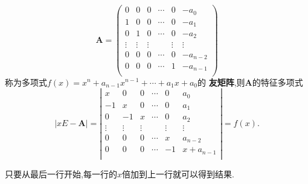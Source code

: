 \documentclass[lang=cn,newtx,10pt,scheme=chinese]{elegantbook}
\begin{document}
\begin{proposition}\label{pro:友矩阵的特征多项式/行列式}
\begin{equation}
\boldsymbol{A}=\left( \begin{matrix}
0&		0&		0&		\cdots&		0&		-a_0\\
1&		0&		0&		\cdots&		0&		-a_1\\
0&		1&		0&		\cdots&		0&		-a_2\\
\vdots&		\vdots&		\vdots&		&		\vdots&		\vdots\\
0&		0&		0&		\cdots&		0&		-a_{n-2}\\
0&		0&		0&		\cdots&		1&		-a_{n-1}\\
\end{matrix} \right) 
\nonumber
\end{equation}
称为多项式$f\left( x \right) =x^n+a_{n-1}x^{n-1}+\cdots +a_1x+a_0$的
\textbf{友矩阵},则$\boldsymbol{A}$的特征多项式
\begin{equation}
|xE-\boldsymbol{A}|=\left| \begin{matrix}
x&		0&		0&		\cdots&		0&		a_0\\
-1&		x&		0&		\cdots&		0&		a_1\\
0&		-1&		x&		\cdots&		0&		a_2\\
\vdots&		\vdots&		\vdots&		&		\vdots&		\vdots\\
0&		0&		0&		\cdots&		x&		a_{n-2}\\
0&		0&		0&		\cdots&		-1&		x+a_{n-1}\\
\end{matrix} \right|=f(x).
\nonumber
\end{equation}
\end{proposition}
\begin{note}
只要从最后一行开始,每一行的$x$倍加到上一行就可以得到结果.
\end{note}
\end{document}
